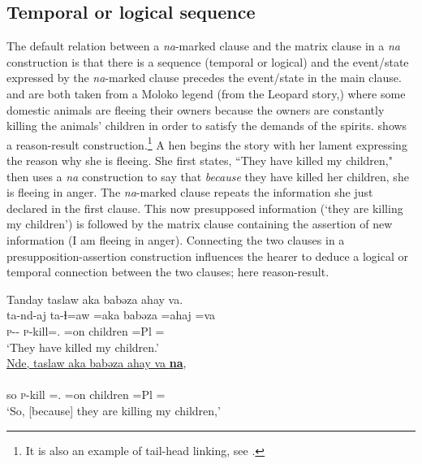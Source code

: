 \subsection{Temporal or logical sequence}\label{sec:11.1.1}
\hypertarget{RefHeading1213181525720847}{}
The default relation between a \textit{na}-marked clause and the matrix clause in a \textit{na} construction is that there is a sequence (temporal or logical) and the event/state expressed by the \textit{na}{}-marked clause precedes the event/state in the main clause.  and  are both taken from a Moloko legend (from the Leopard story,\citealt{Friesen2003}) where some domestic animals are fleeing their owners because the owners are constantly killing the animals’ children in order to satisfy the demands of the spirits.  shows a reason-result construction.\footnote {It is also an example of tail-head linking, see .}  A hen begins the story with her lament expressing the reason why she is fleeing. She first states, “They have killed my children," then uses a \textit{na} construction to say that \textit{because} they have killed her children, she is fleeing in anger. The \textit{na}{}-marked clause repeats the information she just declared in the first clause. This now presupposed information (‘they are killing my children’) is followed by the matrix clause containing the assertion of new information (I am fleeing in anger). Connecting the two clauses in a presupposition-assertion construction influences the hearer to deduce a logical or temporal connection between the two clauses; here reason-result. 


\ea \label{ex:11:15}
Tanday taslaw aka babəza ahay va.\\   
\gll  ta-nd-aj    ta-ɬ=aw  =aka  babəza  =ahaj  =va \\
      \textsc{p}-{\PROG}-{\CL}  \textsc{p}-kill={\oneS}.{\IO}  =on  children  =Pl  {=\PRF} \\    
\glt ‘They have killed my children.’\\

      \medskip
\underline{Nde, taslaw  aka  babəza  ahay  va \textbf{na}},\\      
\gll {}            \\
     so   \textsc{p}-kill  ={\oneS}.{\IO}  =on  children  =Pl  ={\PRF} {\PSP} \\
\glt ‘So, [because] they are killing my children,’\\
      
